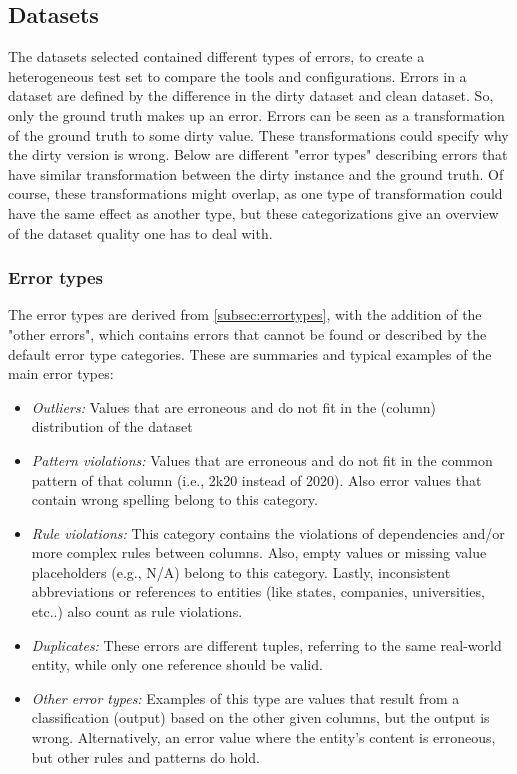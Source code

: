 \subsection{Datasets}
\label{subsec:datasets}
The datasets selected contained different types of errors, to create a heterogeneous test set to compare the tools and configurations. Errors in a dataset are defined by the difference in the dirty dataset and clean dataset. So, only the ground truth makes up an error. Errors can be seen as a transformation of the ground truth to some dirty value. These transformations could specify why the dirty version is wrong. Below are different "error types" describing errors that have similar transformation between the dirty instance and the ground truth. Of course, these transformations might overlap, as one type of transformation could have the same effect as another type, but these categorizations give an overview of the dataset quality one has to deal with.

\subsubsection{Error types}
The error types are derived from \autoref{subsec:errortypes}, with the addition of the "other errors", which contains errors that cannot be found or described by the default error type categories. These are summaries and typical examples of the main error types:

\begin{itemize}
    \item \textit{Outliers:} Values that are erroneous and do not fit in the (column) distribution of the dataset
    \item \textit{Pattern violations:} Values that are erroneous and do not fit in the common pattern of that column (i.e., 2k20 instead of 2020). Also error values that contain wrong spelling belong to this category.
    \item \textit{Rule violations:} This category contains the violations of dependencies and/or more complex rules between columns. Also, empty values or missing value placeholders (e.g., N/A) belong to this category. Lastly, inconsistent abbreviations or references to entities (like states, companies, universities, etc..) also count as rule violations.
    \item \textit{Duplicates:} These errors are different tuples, referring to the same real-world entity, while only one reference should be valid.
    \item \textit{Other error types:} Examples of this type are values that result from a classification (output) based on the other given columns, but the output is wrong. Alternatively, an error value where the entity's content is erroneous, but other rules and patterns do hold.
\end{itemize}

